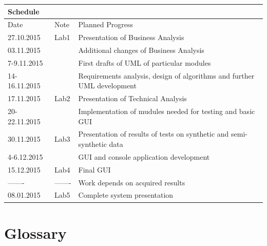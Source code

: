 \documentclass{article}
\begin{document}
\begin{center}


\begin{table}[h]

\large
\begin{tabular}{|l|l|l|}
\hline
\multicolumn{3}{|l|}{\cellcolor[HTML]{C0C0C0}Schedule} \\ \hline
Date         & Note        & Planned Progress          \\ \hline
\hline

27.10.2015   & Lab1    & Presentation of Business Analysis   \\ \hline
03.11.2015   &    & Additional changes of Business Analysis   \\ \hline
7-9.11.2015   &     & First drafts of UML of particular modules   \\ \hline
14-16.11.2015   &     & Requirements analysis, design of algorithms and further UML development \\ \hline
17.11.2015   &  Lab2   & Presentation of Technical Analysis   \\ \hline
20-22.11.2015   &     & Implementation of mudules needed for testing and basic GUI   \\ \hline
30.11.2015   & Lab3    & Presentation of results of tests on synthetic and semi-synthetic data  \\ \hline
4-6.12.2015   &     & GUI and console application development  \\ \hline
15.12.2015   & Lab4    & Final GUI  \\ \hline
-------  & -------    & Work depends on acquired results  \\ \hline
08.01.2015  & Lab5    & Complete system presentation  \\ \hline
\end{tabular}
\end{table}

\end{center}



\newpage

\section{Glossary}


\end{document}
